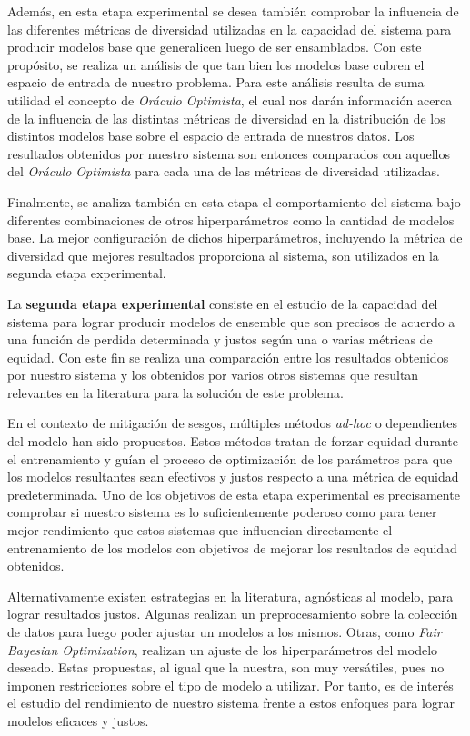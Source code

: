 Además, en esta etapa experimental se desea también comprobar la influencia de las diferentes métricas de diversidad utilizadas en la capacidad del sistema para producir modelos base que generalicen luego de ser ensamblados.
Con este propósito, se realiza un análisis de que tan bien los modelos base cubren el espacio de entrada de nuestro problema.
Para este análisis resulta de suma utilidad el concepto de \emph{Oráculo Optimista}, el cual nos darán información acerca de la influencia de las distintas métricas de diversidad en la distribución de los distintos modelos base sobre el espacio de entrada de nuestros datos.
Los resultados obtenidos por nuestro sistema son entonces comparados con aquellos del \emph{Oráculo Optimista} para cada una de las métricas de diversidad utilizadas.

Finalmente, se analiza también en esta etapa el comportamiento del sistema bajo diferentes combinaciones de otros hiperparámetros como la cantidad de modelos base.
La mejor configuración de dichos hiperparámetros, incluyendo la métrica de diversidad que mejores resultados proporciona al sistema, son utilizados en la segunda etapa experimental.

La \textbf{segunda etapa experimental} consiste en el estudio de la capacidad del sistema para lograr producir modelos de ensemble que son precisos de acuerdo a una función de perdida determinada y justos según una o varias métricas de equidad. 
Con este fin se realiza una comparación entre los resultados obtenidos por nuestro sistema y los obtenidos por varios otros sistemas que resultan relevantes en la literatura para la solución de este problema.

En el contexto de mitigación de sesgos, múltiples métodos \emph{ad-hoc} o dependientes del modelo han sido propuestos.
Estos métodos tratan de forzar equidad durante el entrenamiento y guían el proceso de optimización de los parámetros para que los modelos resultantes sean efectivos y justos respecto a una métrica de equidad predeterminada.
Uno de los objetivos de esta etapa experimental es precisamente comprobar si nuestro sistema es lo suficientemente poderoso como para tener mejor rendimiento que estos sistemas que influencian directamente el entrenamiento de los modelos con objetivos de mejorar los resultados de equidad obtenidos.

Alternativamente existen estrategias en la literatura, agnósticas al modelo, para lograr resultados justos.
Algunas realizan un preprocesamiento sobre la colección de datos para luego poder ajustar un modelos a los mismos.
Otras, como \emph{Fair Bayesian Optimization}, realizan un ajuste de los hiperparámetros del modelo deseado.
Estas propuestas, al igual que la nuestra, son muy versátiles, pues no imponen restricciones sobre el tipo de modelo a utilizar.
Por tanto, es de interés el estudio del rendimiento de nuestro sistema frente a estos enfoques para lograr modelos eficaces y justos.

